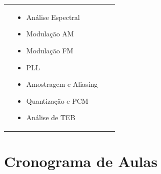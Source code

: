 \documentclass[11pt,a4paper]{article}
\begin{document}
\begin{center}
\begin{tabular}{|p{}|p{}|p{}|p{}|}
{\begin{itemize}[noitemsep, leftmargin=*, nosep, font=\small]
  \end{itemize}
  \vspace{0.2em}
} &
\parbox[t]{0.20\textwidth}{%
  \vspace{0.2em}
  \begin{itemize}[noitemsep, leftmargin=*, nosep, font=\small]
    \item Análise Espectral
    \item Modulação AM
    \item Modulação FM
    \item PLL
    \item Amostragem e Aliasing
    \item Quantização e PCM
    \item Análise de TEB
  \end{itemize}
  \vspace{0.2em}
} \\
\hline
\end{tabular}
\end{center}

\vspace{1.5em}

\section{Cronograma de Aulas}
\end{document}
